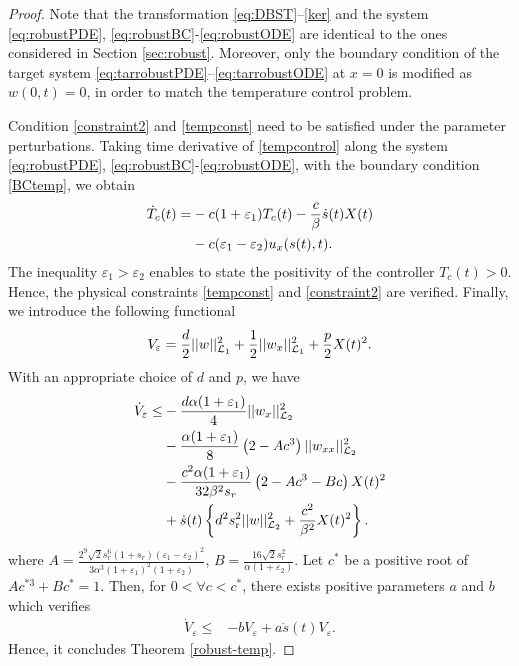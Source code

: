 \documentclass[journal]{IEEEtran}
\begin{document}
\begin{proof}
Note that  the transformation \eqref{eq:DBST}--\eqref{ker}  and the system \eqref{eq:robustPDE}, \eqref{eq:robustBC}-\eqref{eq:robustODE} are identical to the ones considered in   Section \ref{sec:robust}. Moreover, only the boundary condition of the target system \eqref{eq:tarrobustPDE}--\eqref{eq:tarrobustODE} at $x=0$ is modified as $w(0,t) = 0$, in order to  match the temperature control problem. 

Condition \eqref{constraint2} and \eqref{tempconst} need to be satisfied under  the parameter perturbations. Taking time derivative of \eqref{tempcontrol} along the system  \eqref{eq:robustPDE}, \eqref{eq:robustBC}-\eqref{eq:robustODE}, with the boundary condition \eqref{BCtemp}, we obtain 
\begin{align}
\dot{T}_c(t)=&-c (1+\varepsilon_1)  T_c(t) - \frac{c}{\beta} \dot{s}(t)X(t)\notag\\
&-c (\varepsilon_1 - \varepsilon_2) u_x(s(t),t).
\end{align}
The inequality  $\varepsilon_1>\varepsilon_2$ enables to state  the positivity of the controller $T_{c}(t)>0$. Hence, the physical constraints \eqref{tempconst} and \eqref{constraint2} are verified.
Finally, we introduce the following  functional
\begin{align}
V_{\varepsilon} = \frac{d}{2} ||w||_{{\cal L}_1}^2 +  \frac{1}{2} ||w_{x}||_{{\cal L}_1}^2 + \frac{p}{2} X(t)^2. 
\end{align}
With an appropriate choice of $d$ and $p$, we have 
\begin{align}\label{robustestimate2}
\dot{V}_{\varepsilon} \leq& - \frac{d\alpha (1+{\varepsilon}_1)}{4}  ||w_{x}||_{{\cal L}_2}^2\notag\\
&- \frac{\alpha (1+{\varepsilon}_1)}{8}  \left( 2 - Ac^3 \right) ||w_{xx}||_{{\cal L}_2}^2 \notag\\
&- \frac{c^2 \alpha (1+{\varepsilon}_1)}{32\beta^2 s_r} \left( 2 - Ac^3 - Bc  \right)X(t)^2\notag\\
&+\dot{s}(t) \left\{ d^2 s_{{\mathrm r}}^2 || w||_{{\cal L}_2}^2+\frac{ c^2}{\beta ^2}  X(t)^2\right\}.
\end{align}
where $A = \frac{2^9\sqrt{2} s_r^6 (1+s_r) ({\varepsilon}_1-{\varepsilon}_2)^2}{3 \alpha^3 (1+{\varepsilon}_1)^2 (1+{\varepsilon}_2)}$, $B = \frac{16\sqrt{2} s_r^2 }{\alpha (1+{\varepsilon}_2)}$. 
Let $c^*$ be a positive root of $A c^{*3}+Bc^*=1$. Then, for $0<\forall c<c^*$, there exists positive parameters $a$ and $b$ which verifies 
\begin{align}
\dot{V}_{\varepsilon}\leq& -b V_{\varepsilon} + a\dot{s}(t) V_{\varepsilon}. 
\end{align}
Hence, it concludes Theorem \ref{robust-temp}. 
\end{proof}
\end{document}
